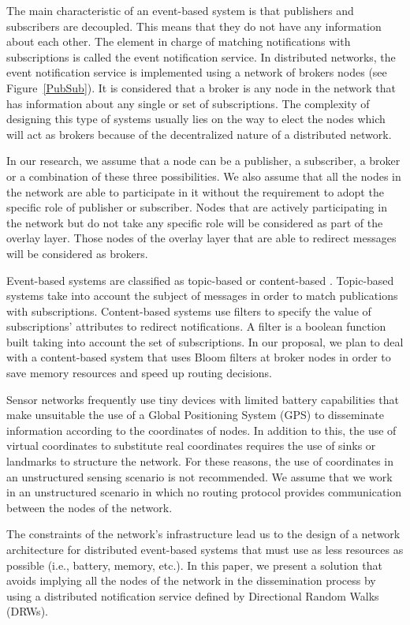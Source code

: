\documentclass[conference]{IEEEtran}
\begin{document}
The main characteristic of an event-based system is that publishers and subscribers are decoupled. This means that they do not have any information about each other. The element in charge of matching notifications with subscriptions is called the event notification service. In distributed networks, the event notification service is implemented using a network of brokers nodes (see Figure~\ref{PubSub}). It is considered that a broker is any node in the network that has information about any single or set of subscriptions. The complexity of designing this type of systems usually lies on the way to elect the nodes which will act as brokers because of the decentralized nature of a distributed network.

In our research, we assume that a node can be a publisher, a subscriber, a broker or a combination of these three possibilities. We also assume that all the nodes in the network are able to participate in it without the requirement to adopt the specific role of publisher or subscriber. Nodes that are actively participating in the network but do not take any specific role will be considered as part of the overlay layer. Those nodes of the overlay layer that are able to redirect messages will be considered as brokers.

Event-based systems are classified as topic-based or content-based \cite{Muhl:2006:DES:1162246}. Topic-based systems take into account the subject of messages in order to match publications with subscriptions. Content-based systems use filters to specify the value of subscriptions' attributes to redirect notifications. A filter is a boolean function built taking into account the set of subscriptions. In our proposal, we plan to deal with a content-based system that uses Bloom filters at broker nodes in order to save memory resources and speed up routing decisions.

Sensor networks frequently use tiny devices with limited battery capabilities that make unsuitable the use of a Global Positioning System (GPS) to disseminate information according to the coordinates of nodes.  In addition to this, the use of virtual coordinates to substitute real coordinates requires the use of sinks or landmarks to structure the network. For these reasons, the use of coordinates in an unstructured sensing scenario is not recommended. We assume that we work in an unstructured scenario in which no routing protocol provides communication between the nodes of the network. 

The constraints of the network's infrastructure lead us to the design of a network architecture for distributed event-based systems that must use as less resources as possible (i.e., battery, memory, etc.). In this paper, we present a solution that avoids implying all the nodes of the network in the dissemination process by using a distributed notification service defined by Directional Random Walks (DRWs).
\end{document}
